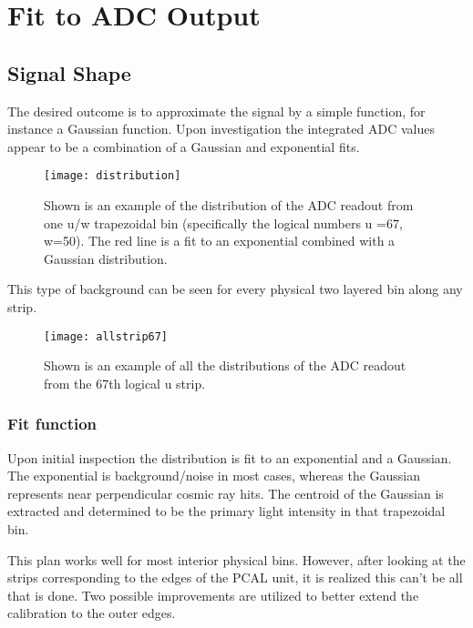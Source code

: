 \section{Fit to ADC Output}
\label{Sec:fitToADCOutput}


\FloatBarrier
\subsection{Signal Shape}
The desired outcome is to approximate the signal by a simple function, for instance a Gaussian function.
Upon investigation the integrated ADC values appear to be a combination of a Gaussian and exponential fits.

\begin{figure}[h]
    \centering
    \texttt{[image: distribution]}
    \caption{Shown is an example of the distribution of the ADC readout from one u/w trapezoidal bin 
    (specifically the logical numbers u =67, w=50). The red line is a fit to an exponential combined with 
    a Gaussian distribution.}
    \label{fig:distribution}
\end{figure}

This type of background can be seen for every physical two layered bin along any strip.

\begin{figure}[h]
    \centering
    \texttt{[image: allstrip67]}
    \caption{Shown is an example of all the distributions of the ADC readout from the 67th logical u strip.}
    \label{fig:allstrip67}
\end{figure}


\FloatBarrier
\subsubsection{Fit function}
Upon initial inspection the distribution is fit to an exponential and a Gaussian. 
The exponential is background/noise in most cases, whereas the Gaussian represents near perpendicular cosmic ray hits. 
The centroid of the Gaussian is extracted and determined to be the primary light intensity in that trapezoidal bin.

This plan works well for most interior physical bins. However, after looking at the strips corresponding to 
the edges of the PCAL unit, it is realized this can't be all that is done. Two possible improvements are 
utilized to better extend the calibration to the outer edges.

